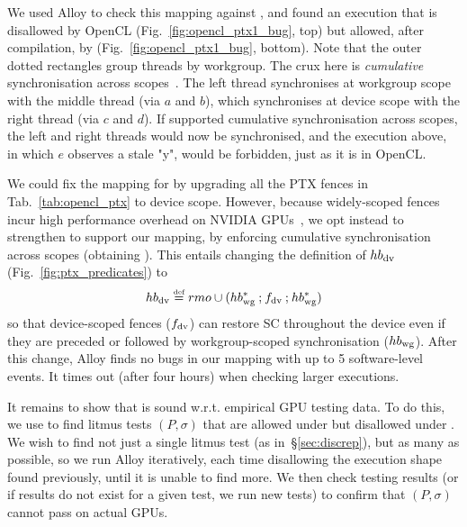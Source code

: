 We used Alloy to check this mapping against , and found an
execution that is disallowed by OpenCL
(Fig.~\ref{fig:opencl_ptx1_bug}, top) but allowed, after compilation,
by  (Fig.~\ref{fig:opencl_ptx1_bug}, bottom). Note that the
outer dotted rectangles group threads by workgroup. The crux here is
\emph{cumulative} synchronisation across
scopes~\cite[\S1.7.1]{power206}. The left thread synchronises at
workgroup scope with the middle thread (via $a$ and $b$), which
synchronises at device scope with the right thread (via $c$ and
$d$). If  supported cumulative synchronisation across scopes,
the left and right threads would now be synchronised, and the
execution above, in which $e$ observes a stale "y", would be
forbidden, just as it is in OpenCL.

We could fix the mapping for  by upgrading all the PTX fences
in Tab.~\ref{tab:opencl_ptx} to device scope. However, because
widely-scoped fences incur high performance overhead on NVIDIA
GPUs~\cite{sorensen+16}, we opt instead to strengthen  to
support our mapping, by enforcing cumulative synchronisation
across scopes (obtaining ). This entails changing the
definition of $hb_{\rm dv}$ (Fig.~\ref{fig:ptx_predicates}) to
%
\[
hb_{\rm dv} \eqdef rmo \cup (hb_{\rm wg}^* \join f_{\rm dv}
 \join hb_{\rm wg}^*)
\]
%
so that device-scoped fences ($f_{\rm dv}$) can restore SC throughout
the device even if they are preceded or followed by workgroup-scoped
synchronisation ($hb_{\rm wg}$). After this change, Alloy finds no
bugs in our mapping with up to 5 software-level events. It times out
(after four hours) when checking larger executions.

It remains to show that  is sound w.r.t. empirical GPU
testing data. To do this, we use  to find litmus tests $(P,\sigma)$
that are allowed under  but disallowed under . We
wish to find not just a single litmus test (as
in~\S\ref{sec:discrep}), but as many as possible, so we run Alloy
iteratively, each time disallowing the execution shape found
previously, until it is unable to find more. We then check testing
results (or if results do not exist for a given test, we run new
tests) to confirm that $(P,\sigma)$ cannot pass on actual GPUs.

